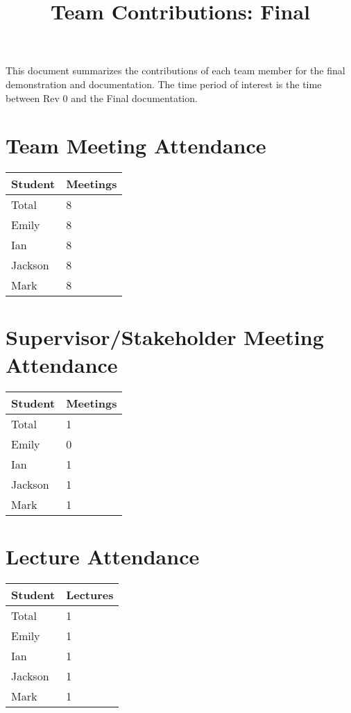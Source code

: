 \documentclass{article}
\title{Team Contributions: Final\\\progname}
\author{\authname}
\date{}
\begin{document}
\maketitle

This document summarizes the contributions of each team member for the final
demonstration and documentation.  The time period of interest is the time
between Rev 0 and the Final documentation.

\section{Team Meeting Attendance}

\begin{table}[H]
\centering
\begin{tabular}{ll}
\toprule
\textbf{Student} & \textbf{Meetings}\\
\midrule
Total & 8\\
Emily & 8\\
Ian & 8\\
Jackson & 8\\
Mark & 8\\
\bottomrule
\end{tabular}
\end{table}

\section{Supervisor/Stakeholder Meeting Attendance}

\begin{table}[H]
\centering
\begin{tabular}{ll}
\toprule
\textbf{Student} & \textbf{Meetings}\\
\midrule
Total & 1\\
Emily & 0\\
Ian & 1\\
Jackson & 1\\
Mark & 1\\
\bottomrule
\end{tabular}
\end{table}


\section{Lecture Attendance}

\begin{table}[H]
\centering
\begin{tabular}{ll}
\toprule
\textbf{Student} & \textbf{Lectures}\\
\midrule
Total & 1\\
Emily & 1\\
Ian & 1\\
Jackson & 1\\
Mark & 1\\
\bottomrule
\end{tabular}
\end{table}
\end{document}
